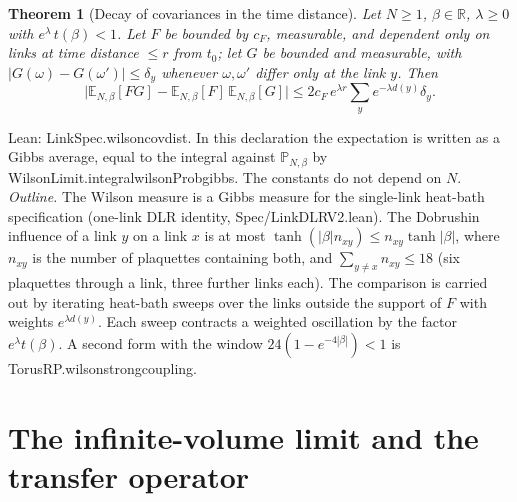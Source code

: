\documentclass[11pt,a4paper]{article}
\newtheorem{theorem}{Theorem}[section]
\theoremstyle{definition}
\theoremstyle{remark}
\newcommand{\leanus}{\textunderscore\allowbreak{}}
\newcommand{\leandot}{.\allowbreak{}}
\newcommand{\leansl}{/\allowbreak{}}
\newcommand{\lean}[1]{{\ttfamily\let\_\leanus #1}}
\newcommand{\R}{\mathbb{R}}
\begin{document}
\begin{theorem}[Decay of covariances in the time distance]\label{thm:dob}
Let $N\ge1$, $\beta\in\R$, $\lambda\ge0$ with $e^{\lambda}\,t(\beta)<1$. Let $F$ be bounded by $c_F$, measurable, and dependent only on links at time distance $\le r$ from $t_0$; let $G$ be bounded and measurable, with $|G(\omega)-G(\omega')|\le\delta_y$ whenever $\omega,\omega'$ differ only at the link $y$. Then
\[
\bigl|\mathbb E_{N,\beta}[FG]-\mathbb E_{N,\beta}[F]\,\mathbb E_{N,\beta}[G]\bigr|\le 2c_F\,e^{\lambda r}\sum_y e^{-\lambda d(y)}\delta_y .
\]
\end{theorem}
Lean: \lean{LinkSpec\leandot{}wilson\_cov\_dist}. In this declaration the expectation is written as a Gibbs average, equal to the integral against $\mathbb P_{N,\beta}$ by \lean{WilsonLimit\leandot{}integral\_wilsonProb\_gibbs}. The constants do not depend on $N$. \emph{Outline.} The Wilson measure is a Gibbs measure for the single-link heat-bath specification (one-link DLR identity, \lean{Spec\leansl{}LinkDLRV2\leandot{}lean}). The Dobrushin influence of a link $y$ on a link $x$ is at most $\tanh(|\beta|n_{xy})\le n_{xy}\tanh|\beta|$, where $n_{xy}$ is the number of plaquettes containing both, and $\sum_{y\ne x}n_{xy}\le18$ (six plaquettes through a link, three further links each). The comparison is carried out by iterating heat-bath sweeps over the links outside the support of $F$ with weights $e^{\lambda d(y)}$. Each sweep contracts a weighted oscillation by the factor $e^\lambda t(\beta)$. A second form with the window $24(1-e^{-4|\beta|})<1$ is \lean{TorusRP\leandot{}wilson\_strong\_coupling}.

\section{The infinite-volume limit and the transfer operator}\label{sec:infvol}
\end{document}
